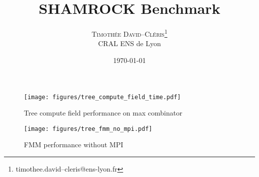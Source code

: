 \documentclass{article}
\title{\textsc{SHAMROCK} Benchmark} %
\author{%
\textsc{Timothée David--Cléris}\thanks{timothee.david--cleris@ens-lyon.fr} \\[1ex] %
\normalsize CRAL ENS de Lyon \\ %
}
\date{\today}
\begin{document}
\maketitle

\begin{figure}[ht!]
\center
\texttt{[image: figures/tree\_compute\_field\_time.pdf]}
\caption{Tree compute field performance on max combinator}
\end{figure}

\begin{figure}[ht!]
\center
\texttt{[image: figures/tree\_fmm\_no\_mpi.pdf]}
\caption{FMM performance without MPI}
\end{figure}
\end{document}
